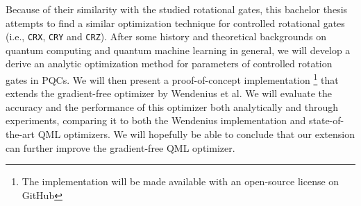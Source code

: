 Because of their similarity with the studied rotational gates, this bachelor
thesis attempts to find a similar optimization technique for controlled rotational gates (i.e., \texttt{CRX},
\texttt{CRY} and \texttt{CRZ}).
After some history and theoretical backgrounds on quantum computing and quantum
machine learning in general, we will develop a derive an analytic optimization
method for parameters of controlled rotation gates in PQCs.
We will then present a proof-of-concept implementation
\footnote{The implementation will be made available with an open-source license
on GitHub}
that extends the gradient-free optimizer by Wendenius et al.
We will evaluate the accuracy and the performance of this optimizer both
analytically and through experiments, comparing it to both the Wendenius
implementation and state-of-the-art QML optimizers.
We will hopefully be able to conclude that our extension can further improve the
gradient-free QML optimizer.
